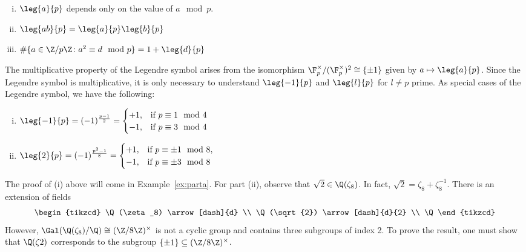 \begin{prop} \hfill
\begin{enumerate}[(i)]
\item $\leg{a}{p}$ depends only on the value of $a \mod p$.
\item $\leg{ab}{p}= \leg{a}{p} \leg{b}{p}$
\item $\#\{ a \in \Z/p\Z \colon a^2 \equiv d \mod p\}= 1+ \leg{d}{p}$
\end{enumerate}
\end{prop}

The multiplicative property of the Legendre symbol arises from the isomorphism $\F_p^\times/(\F_p^\times)^2 \cong \{\pm 1\}$ given by $a \mapsto \leg{a}{p}$. Since the Legendre symbol is multiplicative, it is only necessary to understand $\leg{-1}{p}$ and $\leg{l}{p}$ for $l \neq p$ prime. As special cases of the Legendre symbol, we have the following:

\begin{prop} \label{prop:leg} \hfill
\begin{enumerate}[(i)]
\item $\leg{-1}{p}= (-1)^{\frac{p-1}{2}}= \begin{cases} +1, & \text{if } p \equiv 1 \mod 4 \\ -1, & \text{if } p \equiv 3 \mod 4 \end{cases}$
\item $\leg{2}{p}= (-1)^{\frac{p^2-1}{8}}= \begin{cases} +1, & \text{if } p \equiv \pm 1 \mod 8, \\ -1, & \text{if } p \equiv \pm 3 \mod 8 \end{cases}$
\end{enumerate}
\end{prop}


The proof of (i) above will come in Example~\ref{ex:parta}. For part (ii), observe that $\sqrt{2} \in \Q(\zeta_8)$. In fact, $\sqrt{2}=\zeta_8+\zeta_8^{-1}$. There is an extension of fields
	\[
	\begin{tikzcd}
	\Q(\zeta_8) \arrow[dash]{d} \\
	\Q(\sqrt{2}) \arrow[dash]{d}{2} \\
	\Q
	\end{tikzcd}
	\]
However, $\Gal(\Q(\zeta_8)/\Q) \cong (\Z/8\Z)^\times$ is not a cyclic group and contains three subgroups of index 2. To prove the result, one must show that $\Q(\zeta 2)$ corresponds to the subgroup $\{\pm 1\} \subseteq (\Z/8\Z)^\times$. 


